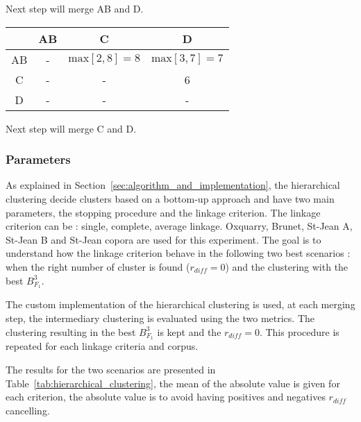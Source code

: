 \begin{example}
  \vspace{0.2cm}
  Next step will merge AB and D.

  \vspace{0.5cm}

  \begin{subexample}{\linewidth}
    \centering
    \begin{tabular}{c|c c c}
      \toprule
        & AB & C & D \\
      \midrule
      AB & - & $\text{max} \left[2, 8 \right] = 8$ & $\text{max} \left[3, 7 \right] = 7$ \\
      C  & - & - & 6 \\
      D  & - & - & - \\
      \bottomrule
    \end{tabular}
  \end{subexample}

  \vspace{0.2cm}
  Next step will merge C and D.
\end{example}


\subsubsection{Parameters\label{sec:hierarchical_clustering}}

As explained in Section~\ref{sec:algorithm_and_implementation}, the hierarchical clustering decide clusters based on a bottom-up approach and have two main parameters, the stopping procedure and the linkage criterion.
The linkage criterion can be : single, complete, average linkage.
Oxquarry, Brunet, St-Jean A, St-Jean B and St-Jean copora are used for this experiment.
The goal is to understand how the linkage criterion behave in the following two best scenarios : when the right number of cluster is found ($r_{diff} = 0$) and the clustering with the best $B^3_{F_1}$.

The custom implementation of the hierarchical clustering is used, at each merging step, the intermediary clustering is evaluated using the two metrics.
The clustering resulting in the best $B^3_{F_1}$ is kept and the $r_{diff} = 0$.
This procedure is repeated for each linkage criteria and corpus.

The results for the two scenarios are presented in Table~\ref{tab:hierarchical_clustering}, the mean of the absolute value is given for each criterion, the absolute value is to avoid having positives and negatives $r_{diff}$ cancelling.

